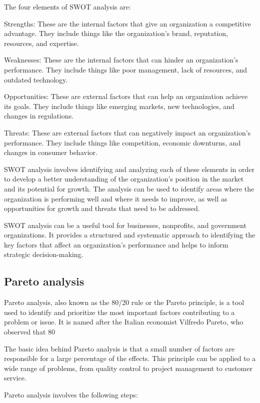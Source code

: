 \documentclass[12pt, a4paper, oneside]{article}
\begin{document}
The four elements of SWOT analysis are:

Strengths: These are the internal factors that give an organization a competitive advantage. They include things like the organization's brand, reputation, resources, and expertise.

Weaknesses: These are the internal factors that can hinder an organization's performance. They include things like poor management, lack of resources, and outdated technology.

Opportunities: These are external factors that can help an organization achieve its goals. They include things like emerging markets, new technologies, and changes in regulations.

Threats: These are external factors that can negatively impact an organization's performance. They include things like competition, economic downturns, and changes in consumer behavior.

SWOT analysis involves identifying and analyzing each of these elements in order to develop a better understanding of the organization's position in the market and its potential for growth. The analysis can be used to identify areas where the organization is performing well and where it needs to improve, as well as opportunities for growth and threats that need to be addressed.

SWOT analysis can be a useful tool for businesses, nonprofits, and government organizations. It provides a structured and systematic approach to identifying the key factors that affect an organization's performance and helps to inform strategic decision-making.




\subsection{ Pareto analysis }
Pareto analysis, also known as the 80/20 rule or the Pareto principle, is a tool used to identify and prioritize the most important factors contributing to a problem or issue. It is named after the Italian economist Vilfredo Pareto, who observed that 80%

The basic idea behind Pareto analysis is that a small number of factors are responsible for a large percentage of the effects. This principle can be applied to a wide range of problems, from quality control to project management to customer service.

Pareto analysis involves the following steps:
\end{document}
